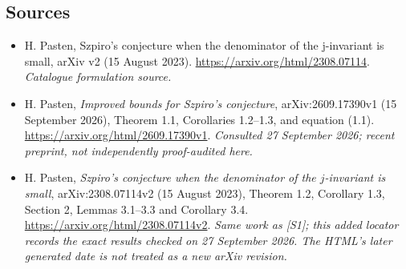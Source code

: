 \documentclass[11pt,a4paper]{article}
\numberwithin{equation}{section}
\begin{document}
\subsection{Sources}
\begin{itemize}\raggedright
\item[\textnormal{[S1]}]\hypertarget{source:9400090:1}{} H. Pasten, Szpiro's conjecture when the denominator of the j-invariant is small, arXiv v2 (15 August 2023).
\url{https://arxiv.org/html/2308.07114}.
{\small\textit{Catalogue formulation source.}}
\item[\textnormal{[E1]}]\hypertarget{extra:9400090:1}{} H. Pasten,
\emph{Improved bounds for Szpiro's conjecture}, arXiv:2609.17390v1
(15 September 2026), Theorem 1.1, Corollaries 1.2--1.3,
and equation (1.1).
\url{https://arxiv.org/html/2609.17390v1}.
{\small\textit{Consulted 27 September 2026; recent preprint, not independently proof-audited here.}}
\item[\textnormal{[E2]}]\hypertarget{extra:9400090:2}{} H. Pasten,
\emph{Szpiro's conjecture when the denominator of the $j$-invariant is small},
arXiv:2308.07114v2 (15 August 2023), Theorem 1.2, Corollary 1.3,
Section 2, Lemmas 3.1--3.3 and Corollary 3.4.
\url{https://arxiv.org/html/2308.07114v2}.
{\small\textit{Same work as [S1]; this added locator records the exact results checked on 27 September 2026. The HTML's later generated date is not treated as a new arXiv revision.}}
\end{itemize}
\end{document}

